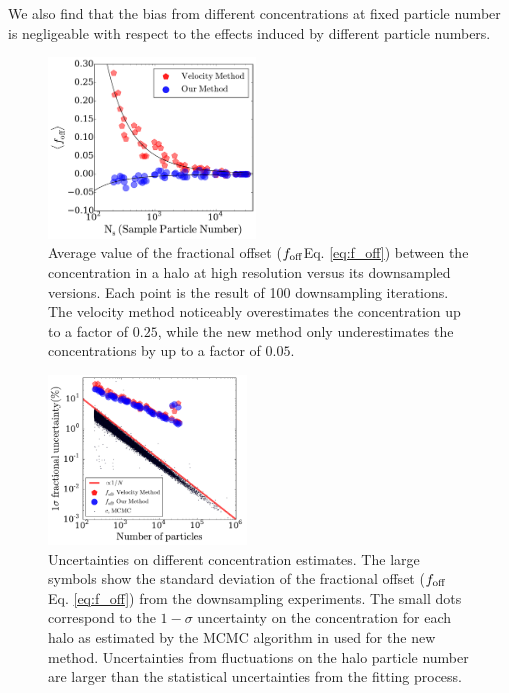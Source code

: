 \documentclass[a4,useAMS,usenatbib,usegraphicx]{mn2e}
\begin{document}
We also find that the bias from different concentrations at fixed
particle number is negligeable with respect to the effects induced by
different particle numbers. 

\begin{figure}
\begin{center}
  \includegraphics[width=0.49\textwidth]{avg_foff_bolshoi.pdf}
\end{center}
\vspace{-0.5cm}
\caption{Average value of the fractional offset ($f_{\rm off}$Eq. \ref{eq:f_off})
  between the concentration in a halo at high resolution versus its
  downsampled  versions. 
  Each point is the result of 100 downsampling iterations.
  The velocity method noticeably overestimates the
  concentration up to a factor of $0.25$, while the new method only
  underestimates the concentrations by up to a factor of $0.05$.
    \label{fig:downsampling}}
\end{figure}

\begin{figure}
\begin{center}
  \includegraphics[width=0.47\textwidth]{error_conc_bolshoi.pdf}
\end{center}
\vspace{-0.5cm}
\caption{Uncertainties on different concentration estimates.
  The large symbols show the standard deviation of the fractional
  offset ($f_{\rm off}$ Eq. \ref{eq:f_off}) from the downsampling
  experiments.  
  The small dots correspond to the $1-\sigma$ uncertainty on the
  concentration for each halo as estimated by the MCMC algorithm in
  used for the new method.
  Uncertainties from fluctuations on the halo particle number are
  larger than the statistical uncertainties from the fitting process. 
  \label{fig:downsampling_err}}
\end{figure}
\end{document}
